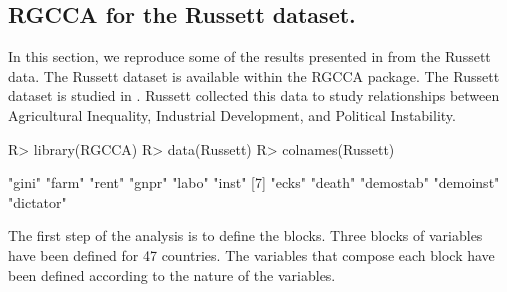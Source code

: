 \documentclass[
]{jss}
\begin{document}
\hypertarget{rgcca-for-the-russett-dataset.}{%
\subsection{RGCCA for the Russett
dataset.}\label{rgcca-for-the-russett-dataset.}}

In this section, we reproduce some of the results presented in
\cite{Tenenhaus2011} from the Russett data. The Russett dataset is
available within the RGCCA package. The Russett dataset
\citep{Russett1964} is studied in \cite{Gifi1990}. Russett collected
this data to study relationships between Agricultural Inequality,
Industrial Development, and Political Instability.

\footnotesize

\begin{CodeChunk}
\begin{CodeInput}
R> library(RGCCA)
R> data(Russett)
R> colnames(Russett)
\end{CodeInput}
\begin{CodeOutput}
 [1] "gini"     "farm"     "rent"     "gnpr"     "labo"     "inst"    
 [7] "ecks"     "death"    "demostab" "demoinst" "dictator"
\end{CodeOutput}
\end{CodeChunk}

\normalsize

The first step of the analysis is to define the blocks. Three blocks of
variables have been defined for 47 countries. The variables that compose
each block have been defined according to the nature of the variables.
\end{document}
